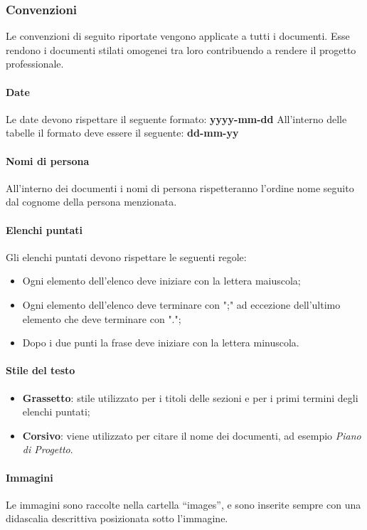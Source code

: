 \subsubsection{Convenzioni}
Le convenzioni di seguito riportate vengono applicate a tutti i documenti.
Esse rendono i documenti stilati omogenei tra loro contribuendo a rendere il progetto professionale.

\paragraph{Date}
Le date devono rispettare il seguente formato: \textbf{yyyy-mm-dd}
All'interno delle tabelle il formato deve essere il seguente: \textbf{dd-mm-yy}
\paragraph{Nomi di persona}
All'interno dei documenti i nomi di persona rispetteranno l'ordine nome seguito dal cognome della persona menzionata.

\paragraph{Elenchi puntati}
Gli elenchi puntati devono rispettare le seguenti regole:
\begin{itemize} 
    \item Ogni elemento dell'elenco deve iniziare con la lettera maiuscola;
    \item Ogni elemento dell'elenco deve terminare con ";" ad eccezione dell'ultimo elemento
    che deve terminare con "."; 
    \item Dopo i due punti la frase deve iniziare con la lettera minuscola.
\end{itemize}

\paragraph{Stile del testo}
\begin{itemize} 
    \item \textbf{Grassetto}: stile utilizzato per i titoli delle sezioni e per i primi termini degli elenchi puntati;
    \item \textbf{Corsivo}: viene utilizzato per citare il nome dei documenti, ad esempio \textit{Piano di Progetto}. 
\end{itemize}

\paragraph{Immagini}
Le immagini sono raccolte nella cartella “images”, e sono inserite sempre con una didascalia descrittiva posizionata sotto l’immagine.

